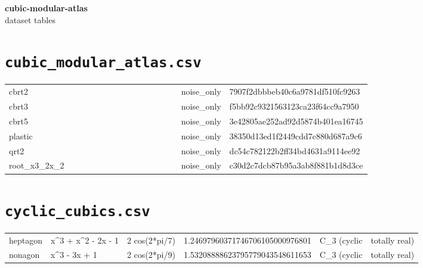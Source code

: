 \documentclass[10pt]{article}
\begin{document}
\begin{center}\Large\textbf{cubic-modular-atlas} \\ \normalsize dataset tables\end{center}
\vspace{1em}
\section*{\texttt{cubic\_modular\_atlas.csv}}
{\footnotesize
\begin{longtable}{@{}llllllllllllllll@{}}
\toprule
\midrule\endhead
cbrt2 &  &  &  &  &  &  &  &  &  &  &  &  &  & noise\_only & 7907f2dbbbeb40c6a9781df510fc9263 \\
cbrt3 &  &  &  &  &  &  &  &  &  &  &  &  &  & noise\_only & f5bb92c9321563123ca23f64cc9a7950 \\
cbrt5 &  &  &  &  &  &  &  &  &  &  &  &  &  & noise\_only & 3e42805ae252ad92d5874b401ea16745 \\
plastic &  &  &  &  &  &  &  &  &  &  &  &  &  & noise\_only & 38350d13ed1f2449cdd7c880d687a9c6 \\
qrt2 &  &  &  &  &  &  &  &  &  &  &  &  &  & noise\_only & dc54c782122b2ff34bd4631a9114ee92 \\
root\_x3\_2x\_2 &  &  &  &  &  &  &  &  &  &  &  &  &  & noise\_only & c30d2c7dcb87b95a3ab8f881b1d8d3ce \\
\bottomrule
\end{longtable}}


\section*{\texttt{cyclic\_cubics.csv}}
{\footnotesize
\begin{longtable}{@{}llllll@{}}
\toprule
\midrule\endhead
heptagon & x\textasciicircum{}3 + x\textasciicircum{}2 - 2x - 1 & 2 cos(2*pi/7) & 1.24697960371746706105000976801 & C\_3 (cyclic &  totally real) \\
nonagon & x\textasciicircum{}3 - 3x + 1 & 2 cos(2*pi/9) & 1.53208888623795779043548611653 & C\_3 (cyclic &  totally real) \\
\bottomrule
\end{longtable}}
\end{document}
